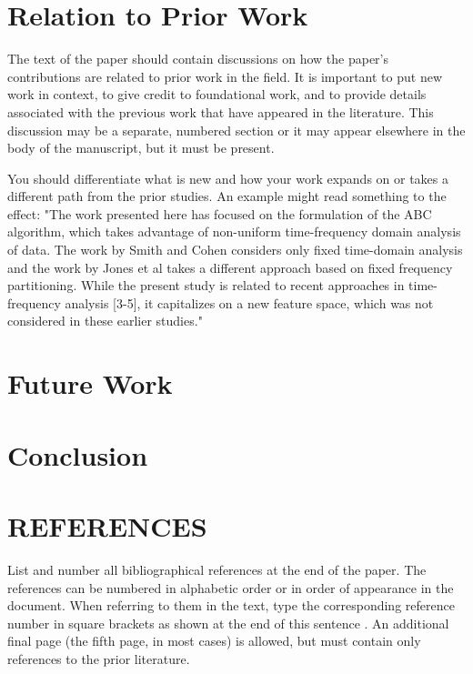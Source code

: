 \documentclass{article}
\begin{document}
\section{Relation to Prior Work}
\label{sec:prior}

The text of the paper should contain discussions on how the paper's
contributions are related to prior work in the field. It is important
to put new work in  context, to give credit to foundational work, and
to provide details associated with the previous work that have appeared
in the literature. This discussion may be a separate, numbered section
or it may appear elsewhere in the body of the manuscript, but it must
be present.

You should differentiate what is new and how your work expands on
or takes a different path from the prior studies. An example might
read something to the effect: "The work presented here has focused
on the formulation of the ABC algorithm, which takes advantage of
non-uniform time-frequency domain analysis of data. The work by
Smith and Cohen considers only fixed time-domain analysis and
the work by Jones et al takes a different approach based on
fixed frequency partitioning. While the present study is related
to recent approaches in time-frequency analysis [3-5], it capitalizes
on a new feature space, which was not considered in these earlier
studies."


\section{Future Work}
\label{sec:future}

\section{Conclusion}
\label{sec:future}

\vfill\pagebreak

\section{REFERENCES}
\label{sec:refs}

List and number all bibliographical references at the end of the
paper. The references can be numbered in alphabetic order or in
order of appearance in the document. When referring to them in
the text, type the corresponding reference number in square
brackets as shown at the end of this sentence . An
additional final page (the fifth page, in most cases) is
allowed, but must contain only references to the prior
literature.

\end{document}
